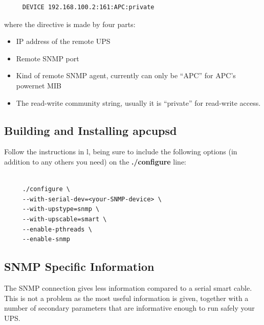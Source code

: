 {{{{{{{{{{\begin{verbatim}
     DEVICE 192.168.100.2:161:APC:private
\end{verbatim}
\normalsize

where the directive is made by four parts:  

\begin{itemize}
\item IP address of the remote UPS  
\item Remote SNMP port  
\item Kind of remote SNMP agent, currently can only be ``APC'' for APC's
   powernet MIB  
\item The read-write community string, usually it is ``private'' for
   read-write access. 
   \end{itemize}

\label{Building-and-Installing-apcupsd-_003c1_003e}

\subsection*{Building and Installing apcupsd}

Follow the instructions in 
l, being sure to include
the following options (in addition to any others you need) on the {\bf
./configure} line: 

\footnotesize
\begin{verbatim}
     
     ./configure \
     --with-serial-dev=<your-SNMP-device> \
     --with-upstype=snmp \
     --with-upscable=smart \
     --enable-pthreads \
     --enable-snmp
\end{verbatim}
\normalsize

\label{SNMP-Specific-Information}

\subsection*{SNMP Specific Information}

\label{index-SNMP-164}
The SNMP connection gives less information compared to a serial smart cable.
This is not a problem as the most useful information is given, together with a
number of secondary parameters that are informative enough to run safely your
UPS. 

}}}}}}}}}}
